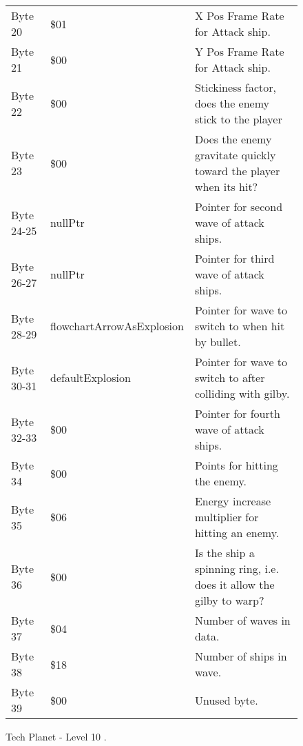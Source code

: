 \begin{figure}[H]
{\begin{adjustbox}{width=12cm}
\begin{tabular}{lll}
 Byte 20    & \$01                       & X Pos Frame Rate for Attack ship.                                   \\
 Byte 21    & \$00                       & Y Pos Frame Rate for Attack ship.                                   \\
 Byte 22    & \$00                       & Stickiness factor, does the enemy stick to the player               \\
 Byte 23    & \$00                       & Does the enemy gravitate quickly toward the player when its hit?    \\
 Byte 24-25 & nullPtr                   & Pointer for second wave of attack ships.                            \\
 Byte 26-27 & nullPtr                   & Pointer for third wave of attack ships.                             \\
 Byte 28-29 & flowchartArrowAsExplosion & Pointer for wave to switch to when hit by bullet.                   \\
 Byte 30-31 & defaultExplosion          & Pointer for  wave to switch to after colliding with gilby.          \\
 Byte 32-33 & \$00                       & Pointer for fourth wave of attack ships.                            \\
 Byte 34    & \$00                       & Points for hitting the enemy.                                       \\
 Byte 35    & \$06                       & Energy increase multiplier for hitting an enemy.                    \\
 Byte 36    & \$00                       & Is the ship a spinning ring, i.e. does it allow the gilby to warp?  \\
 Byte 37    & \$04                       & Number of waves in data.                                            \\
 Byte 38    & \$18                       & Number of ships in wave.                                            \\
 Byte 39    & \$00                       & Unused byte.                                                        \\
\bottomrule
\end{tabular}

  \end{adjustbox}

  }\caption*{Tech Planet - Level 10
.}
\end{figure}

